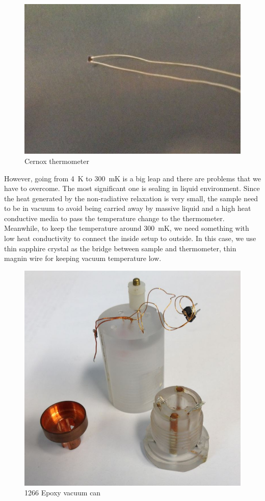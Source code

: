 \documentclass[12pt]{ruthesis}
\begin{document}
\begin{figure}
  \centering
  \includegraphics[scale=0.5]{figures/thermometercx.JPG}
  \caption{Cernox thermometer}
  \label{thermometer}
\end{figure}
 
 
However, going from \SI{4}{\kelvin} to \SI{300}{\milli\kelvin} is a big leap and there are problems that we have to overcome.
The most significant one is sealing in  liquid environment.
Since the heat generated by the non-radiative relaxation is very small, the sample need to be in vacuum to avoid being carried away by massive  liquid and a high heat conductive media to pass the temperature change to the thermometer.
Meanwhile, to keep the temperature around \SI{300}{\milli\kelvin}, we need something with low heat conductivity to connect the inside setup to outside.
In this case, we use thin sapphire crystal as the bridge between sample and thermometer, thin magnin wire for keeping vacuum temperature low. 
 

\begin{figure}
  \centering
  \includegraphics[scale=0.5]{figures/vacuumcan.JPG}
  \caption{1266 Epoxy vacuum can}
  \label{vacuum-can}
\end{figure}
 
\end{document}
